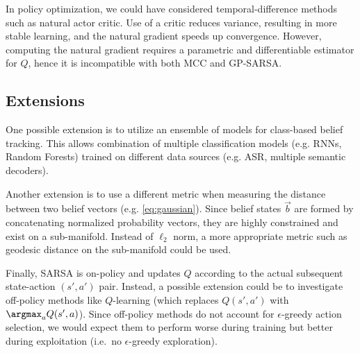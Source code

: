 \documentclass[a4paper,oneside,reqno]{amsart}
\begin{document}
In policy optimization, we could have considered temporal-difference methods
such as natural actor critic\cite{thomson2013statistical}. Use of a critic
reduces variance, resulting in more stable learning, and the natural
gradient\cite{amari1998natural} speeds up convergence.  However, computing the
natural gradient requires a parametric and differentiable estimator for $Q$, hence
it is incompatible with both MCC and GP-SARSA.

\subsection{Extensions}

One possible extension is to utilize an ensemble of models for class-based
belief tracking. This allows combination of multiple classification models
(e.g. RNNs, Random Forests) trained on different data sources (e.g. ASR,
multiple semantic decoders).

Another extension is to use a different metric when measuring the
distance between two belief vectors (e.g. \autoref{eq:gaussian}). Since belief
states $\vec{b}$ are formed by concatenating normalized probability vectors,
they are highly constrained and exist on a sub-manifold. Instead of $\ell_2$
norm, a more appropriate metric such as geodesic distance on the sub-manifold
could be used.

Finally, SARSA is on-policy and updates $Q$ according to the actual subsequent
state-action $(s',a')$ pair. Instead, a possible extension could be to
investigate off-policy methods like $Q$-learning (which replaces $Q(s',a')$
with $\argmax_a Q(s',a)$).  Since off-policy methods do not account for
$\epsilon$-greedy action selection, we would expect them to perform worse
during training but better during exploitation (i.e.\ no $\epsilon$-greedy
exploration).



\nocite{*}





\end{document}
